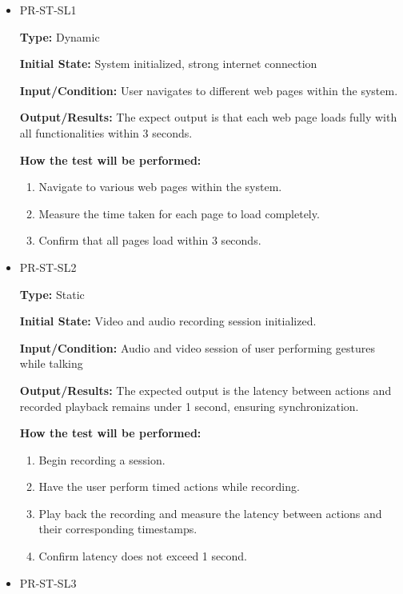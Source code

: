 \documentclass[12pt, titlepage]{article}
\begin{document}
\begin{itemize}
  \item PR-ST-SL1
  \begin{mdframed}[linewidth=0.5mm]
      \textbf{Type:} Dynamic\par
      \textbf{Initial State:} System initialized, strong internet connection \par
      \textbf{Input/Condition:} User navigates to different web pages within the system. \par
      \textbf{Output/Results:} The expect output is that each web page loads fully with all functionalities within 3 seconds. \par
      \textbf{How the test will be performed:}
      \begin{enumerate}[noitemsep]
        \item Navigate to various web pages within the system.
        \item Measure the time taken for each page to load completely.
        \item Confirm that all pages load within 3 seconds.
      \end{enumerate}
  \end{mdframed}
  \item PR-ST-SL2
  \begin{mdframed}[linewidth=0.5mm]
      \textbf{Type:} Static \par
      \textbf{Initial State:} Video and audio recording session initialized. \par
      \textbf{Input/Condition:} Audio and video session of user performing gestures while talking \par
      \textbf{Output/Results:} The expected output is the latency between actions and recorded playback remains under 1 second, ensuring synchronization. \par
      \textbf{How the test will be performed:}
      \begin{enumerate}[noitemsep]
        \item Begin recording a session.
        \item Have the user perform timed actions while recording.
        \item Play back the recording and measure the latency between actions and their corresponding timestamps.
        \item Confirm latency does not exceed 1 second.
      \end{enumerate}
  \end{mdframed}
  \item PR-ST-SL3

\end{itemize}
\end{document}
